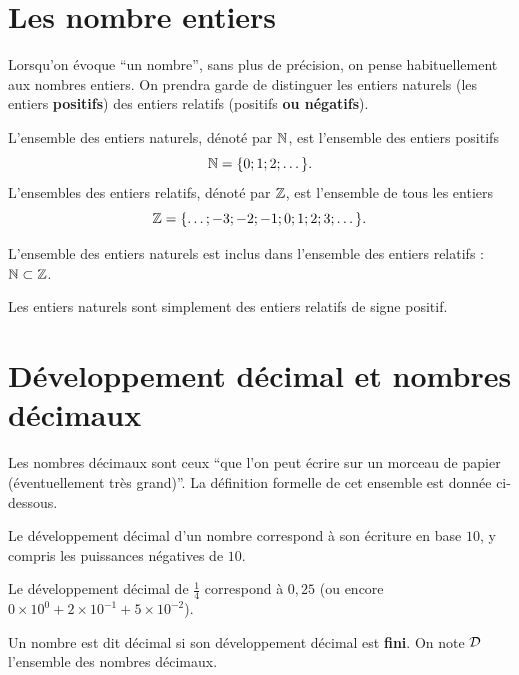 \documentclass[a4paper, 12pt]{report}
\begin{document}
\section{Les nombre entiers}

Lorsqu'on évoque ``un nombre'', sans plus de précision, on pense habituellement aux nombres entiers. On prendra garde de distinguer les entiers naturels (les entiers \textbf{positifs}) des entiers relatifs (positifs \textbf{ou négatifs}).

\begin{defn}
L'ensemble des entiers naturels, dénoté par $\mathbb{N}$, est l'ensemble des entiers positifs 
\[ \mathbb{N} = \{0 ; 1; 2 ; \dots \}. \]
L'ensembles des entiers relatifs, dénoté par $\mathbb{Z}$, est l'ensemble de tous les entiers 
\[ \mathbb{Z} = \{ \dots ; -3 ; -2; -1 ; 0 ; 1 ; 2 ; 3 ; \dots \}. \]
\end{defn}

\begin{prop}
L'ensemble des entiers naturels est inclus dans l'ensemble des entiers relatifs : $\mathbb{N} \subset \mathbb{Z}$.
\end{prop}

\begin{rmq}
Les entiers naturels sont simplement des entiers relatifs de signe positif.
\end{rmq}

\section{Développement décimal et nombres décimaux}

Les nombres décimaux sont ceux ``que l'on peut écrire sur un morceau de papier (éventuellement très grand)''. La définition formelle de cet ensemble est donnée ci-dessous.

\begin{defn}
Le développement décimal d'un nombre correspond à son écriture en base $10$, y compris les puissances négatives de $10$.
\end{defn}

\begin{ex}
Le développement décimal de $\frac{1}{4}$ correspond à $0,25$ (ou encore $0 \times 10^0 + 2 \times 10^{-1} + 5 \times 10^{-2}$).
\end{ex}

\begin{defn}
Un nombre est dit décimal si son développement décimal est \textbf{fini}. On note $\mathcal{D}$ l'ensemble des nombres décimaux.
\end{defn}
\end{document}
